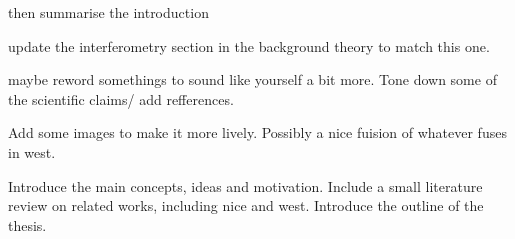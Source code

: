 then summarise the introduction




update the interferometry section in the background theory to match this one.


maybe reword somethings to sound like yourself a bit more. Tone down some of the scientific claims/ add refferences.

Add some images to make it more lively. Possibly a nice fuision of whatever fuses in west. 

Introduce the main concepts, ideas and motivation. Include a small literature review on related works, including \gls{nice} and \gls{west}. Introduce the outline of the thesis.




